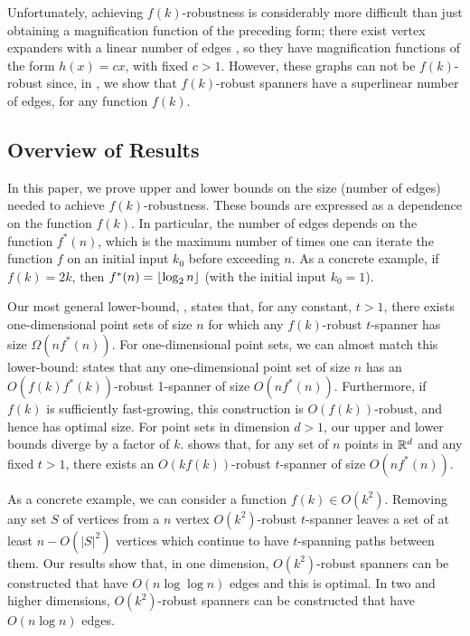\documentclass[final]{siamltex}
\begin{document}
Unfortunately, achieving $f(k)$-robustness is considerably more difficult
than just obtaining a magnification function of the preceding form;
there exist vertex expanders with a linear number of edges \cite{hlw06},
so they have magnification functions of the form $h(x)=cx$, with
fixed $c>1$.  However, these graphs can not be $f(k)$-robust since,
in , we show that $f(k)$-robust spanners
have a superlinear number of edges, for any function $f(k)$.


\subsection{Overview of Results}

In this paper, we prove upper and lower bounds on the size (number of
edges) needed to achieve $f(k)$-robustness.
These bounds are expressed as a dependence on the function $f(k)$.
In particular, the number of edges depends on the function $f^*(n)$,
which is the maximum number of times one can iterate the function $f$ on
an initial input $k_0$ before exceeding $n$.  As a concrete example, if
$f(k)=2k$, then  $f^*(n)={\lfloor \log_2 n \rfloor}$ (with the initial input $k_0=1$).

Our most general lower-bound, , states
that, for any constant, $t>1$, there exists one-dimensional point
sets of size $n$ for which any $f(k)$-robust $t$-spanner has size
$\Omega(nf^*(n))$.  For one-dimensional point sets, we can almost match
this lower-bound:  states that any one-dimensional
point set of size $n$ has an $O(f(k)f^*(k))$-robust 1-spanner of size
$O(nf^*(n))$.  Furthermore, if $f(k)$ is sufficiently fast-growing, this
construction is $O(f(k))$-robust, and hence has optimal size.  For point
sets in dimension $d>1$, our upper and lower bounds diverge by a factor
of $k$.   shows that, for any set of $n$ points in $\mathbb{R}^d$
and any fixed $t>1$, there exists an $O(kf(k))$-robust $t$-spanner of
size $O(nf^*(n))$.

As a concrete example, we can consider a function $f(k)\in O(k^2)$.
Removing any set $S$ of vertices from a $n$ vertex $O(k^2)$-robust
$t$-spanner leaves a set of at least $n-O(|S|^2)$ vertices which continue
to have $t$-spanning paths between them.  Our results show that, in
one dimension, $O(k^2)$-robust spanners can be constructed that have
$O(n\log\log n)$ edges and this is optimal.  In two and higher dimensions,
$O(k^2)$-robust spanners can be constructed that have $O(n\log n)$ edges.
\end{document}
